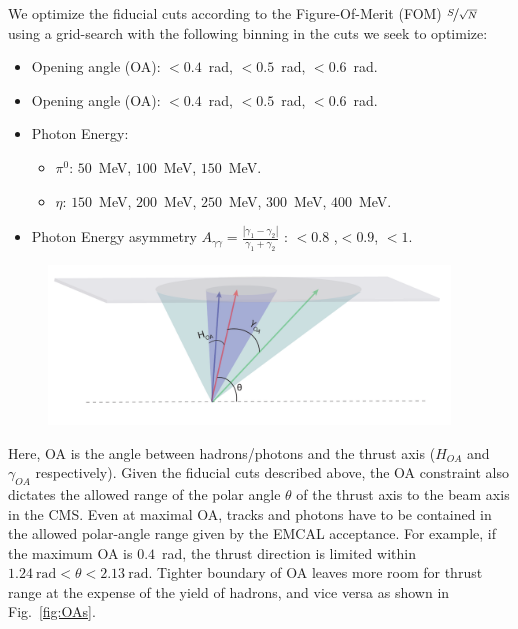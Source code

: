 We optimize the fiducial cuts according to the Figure-Of-Merit (FOM) $\nicefrac{S}{\sqrt{N}}$ using a grid-search with the following binning in the cuts we seek to optimize:
\begin{itemize}
  \item Opening angle (OA): $<0.4$~rad, $<0.5$~rad, $<0.6$~rad.
  \item Opening angle (OA): $<0.4$~rad, $<0.5$~rad, $<0.6$~rad.
  \item Photon Energy:
    \begin{itemize}
      \item $\pi^{0}$: $50$~MeV, $100$~MeV, $150$~MeV. 
      \item $\eta$: $150$~MeV, $200$~MeV, $250$~MeV, $300$~MeV, $400$~MeV. 
    \end{itemize}
  \item Photon Energy asymmetry $A_{\gamma\gamma}=\frac{|\gamma_1-\gamma_2|}{\gamma_1+\gamma_2}$ : $<0.8$ ,$<0.9$, $<1$.
\end{itemize}



\begin{figure}[H]
  \centering
  \includegraphics[width=0.95\textwidth,natwidth=610,natheight=642]{figure_dataselection/OA.pdf}
  \label{fig:FiducialCut}
\end{figure}
Here, OA is the angle between hadrons/photons and the thrust axis ($H_{OA}$ and $\gamma_{OA}$ respectively). Given the fiducial cuts described above, the OA constraint also dictates the allowed range of the polar angle $\theta$ of the thrust axis to the beam axis in the CMS.  Even at maximal OA, tracks and photons have to be contained in the allowed polar-angle range given by the EMCAL acceptance. For example, if the maximum OA is $0.4$~rad, the thrust direction is limited within $1.24~\text{rad}<\theta<2.13~\text{rad}$.  Tighter boundary of OA leaves more room for thrust range at the expense of the yield of hadrons, and vice versa as shown in Fig.~\ref{fig:OAs}. 


